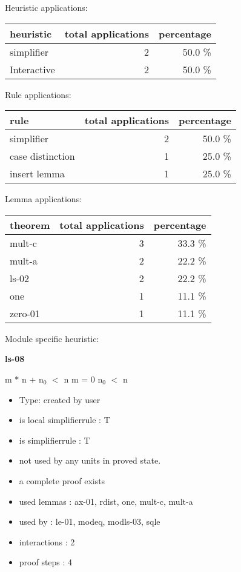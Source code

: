 \documentclass[a4paper]{article}
\begin{document}
\medskip


Heuristic applications:

\begin{supertabular}{l|r|r}
heuristic	& total applications & percentage \\ \hline
simplifier & 2 & 50.0 \% \\
Interactive & 2 & 50.0 \% \\

\end{supertabular}

Rule applications:

\begin{supertabular}{l|r|r}
rule	        & total applications & percentage \\ \hline
simplifier & 2 & 50.0 \% \\
case distinction & 1 & 25.0 \% \\
insert lemma & 1 & 25.0 \% \\

\end{supertabular}

Lemma applications:

\begin{supertabular}{l|r|r}
theorem	        & total applications & percentage \\ \hline
mult-c & 3 & 33.3 \% \\
mult-a & 2 & 22.2 \% \\
ls-02 & 2 & 22.2 \% \\
one & 1 & 11.1 \% \\
zero-01 & 1 & 11.1 \% \\

\end{supertabular}

Module specific heuristic:

\pagebreak

{\LARGE\bf ls-08}\label{lemma-ls-08}

\medskip

 \Fol m $*$ n + $\mbox{n}_{0}$ $<$ n \Equiv m = 0 \And $\mbox{n}_{0}$ $<$ n

\begin{itemize}

\item Type: created by user

\item is local simplifierrule : T
\item is simplifierrule : T
\item not used by any units in proved state.
\item       a complete proof exists
\item       used lemmas  : ax-01, rdist, one, mult-c, mult-a
\item       used by      : le-01, modeq, modls-03, sqle
\item       interactions : 2
\item       proof steps  : 4
\end{itemize}
\end{document}
